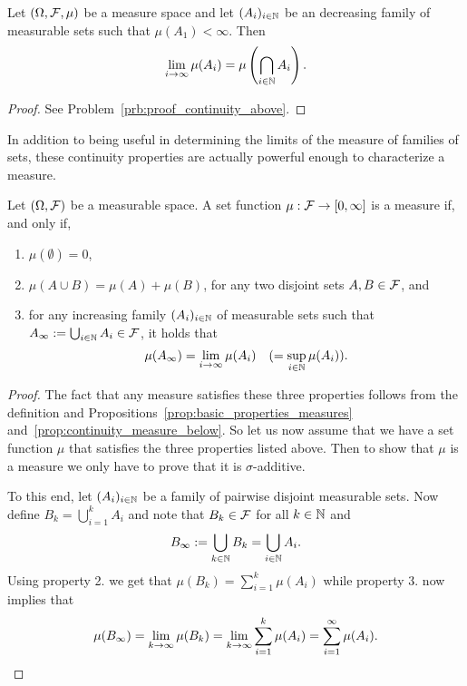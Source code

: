 \begin{proposition}\label{prop:continuity_measure_above}
Let $(\Omega, \mathcal F, \mu)$ be a measure space and let $(A_i)_{i \in \mathbb N}$ be an decreasing family of measurable sets such that $\mu(A_1) < \infty$. Then
\[
	\lim_{i \to \infty} \mu(A_i) = \mu\left(\bigcap_{i \in \mathbb N} A_i\right).
\]
\end{proposition}

\begin{proof}
See Problem~\ref{prb:proof_continuity_above}.
\end{proof}

In addition to being useful in determining the limits of the measure of families of sets, these continuity properties are actually powerful enough to characterize a measure. 

\begin{theorem}
Let $(\Omega, \mathcal F)$ be a measurable space. A set function $\mu : \mathcal F \to [0,\infty]$ is a measure if, and only if,
\begin{enumerate}
\item $\mu(\emptyset) = 0$,
\item $\mu(A \cup B) = \mu(A) + \mu(B)$, for any two disjoint sets $A, B \in \mathcal F$, and
\item for any increasing family $(A_i)_{i \in \mathbb N}$ of measurable sets such that $A_\infty := \bigcup_{i \in \mathbb N} A_i \in \mathcal F$, it holds that
\[
	\mu(A_\infty) = \lim_{i \to \infty} \mu(A_i) \quad (= \sup_{i \in \mathbb N} \mu(A_i)).
\]
\end{enumerate}
\end{theorem}

\begin{proof}
The fact that any measure satisfies these three properties follows from the definition and Propositions~\ref{prop:basic_properties_measures} and~\ref{prop:continuity_measure_below}. So let us now assume that we have a set function $\mu$ that satisfies the three properties listed above. Then to show that $\mu$ is a measure we only have to prove that it is $\sigma$-additive.

To this end, let $(A_i)_{i \in \mathbb N}$ be a family of pairwise disjoint measurable sets. Now define $B_k = \bigcup_{i = 1}^k A_i$ and note that $B_k \in \mathcal F$ for all $k \in \mathbb N$ and
\[
	B_\infty := \bigcup_{k \in \mathbb N} B_k = \bigcup_{i \in \mathbb N} A_i.
\]
Using property 2. we get that $\mu(B_k) = \sum_{i = 1}^k \mu(A_i)$ while property 3. now implies that
\[
	\mu(B_\infty) = \lim_{k \to \infty} \mu(B_k) = \lim_{k \to \infty} \sum_{i = 1}^k \mu(A_i) = \sum_{i = 1}^\infty \mu(A_i). \qedhere
\]
\end{proof}

